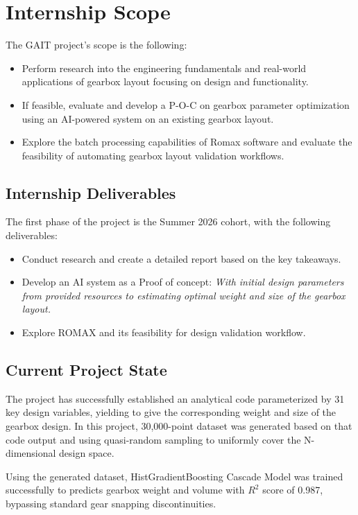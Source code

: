 \section{Internship Scope}
	The GAIT project's scope is the following: 
		\begin{itemize}
			\item Perform research into the engineering fundamentals and 
			real-world applications of gearbox layout focusing on design 
			and functionality. 
			\item If feasible, evaluate and develop a P-O-C on gearbox 
			parameter optimization using an AI-powered system on an existing 
			gearbox layout. 
			\item Explore the batch processing capabilities of Romax software
			 and evaluate the feasibility of automating gearbox layout 
			 validation workflows. 
		\end{itemize}

	\subsection{Internship Deliverables}
		The first phase of the project is the Summer 2026 cohort, with the following deliverables: 
		\begin{itemize}
			\item Conduct research and create a detailed report based on the key takeaways.
			\item Develop an AI system as a Proof of concept: \textit{With initial design parameters from provided resources to estimating optimal weight and size of the gearbox layout.}
			\item Explore ROMAX and its feasibility for design validation workflow.   
		\end{itemize}

		\subsection{Current Project State}
		The project has successfully established an analytical code parameterized by 31 key design variables, yielding to 
		give the corresponding weight and size of the gearbox design. In this project, 30,000-point dataset was generated 
		based on that code output and using quasi-random sampling to uniformly cover the N-dimensional design space. 

		Using the generated dataset, HistGradientBoosting Cascade Model was trained successfully to predicts gearbox weight 
		and volume with $R^2$ score of 0.987, bypassing standard gear snapping discontinuities.

		


